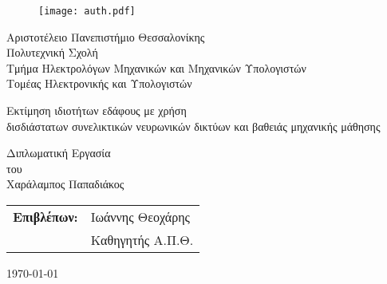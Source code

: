 \begin{titlepage}

\begin{figure}[H]
  \begin{center}
    \texttt{[image: auth.pdf]}
    \label{fig:cover_auth_logo}
  \end{center}
\end{figure}

\centering
\Large Αριστοτέλειο Πανεπιστήμιο Θεσσαλονίκης\\
\Large Πολυτεχνική Σχολή\\
\large Τμήμα Ηλεκτρολόγων Μηχανικών και Μηχανικών Υπολογιστών\\
\large Τομέας Ηλεκτρονικής και Υπολογιστών

\vspace{\fill}

\LARGE Εκτίμηση ιδιοτήτων εδάφους με χρήση\\
\LARGE δισδιάστατων συνελικτικών νευρωνικών δικτύων
\LARGE και βαθειάς μηχανικής μάθησης

\vspace{\fill}

\Large Διπλωματική Εργασία\\
\Large του\\
\Large Χαράλαμπος Παπαδιάκος

\vspace{\fill}
\raggedright

\begin{tabular}{ll}
\textbf{Επιβλέπων:} & Ιωάννης Θεοχάρης\\
 & Καθηγητής Α.Π.Θ.\\
\end{tabular}

\centering
\vspace{\fill}
\today

\end{titlepage}

